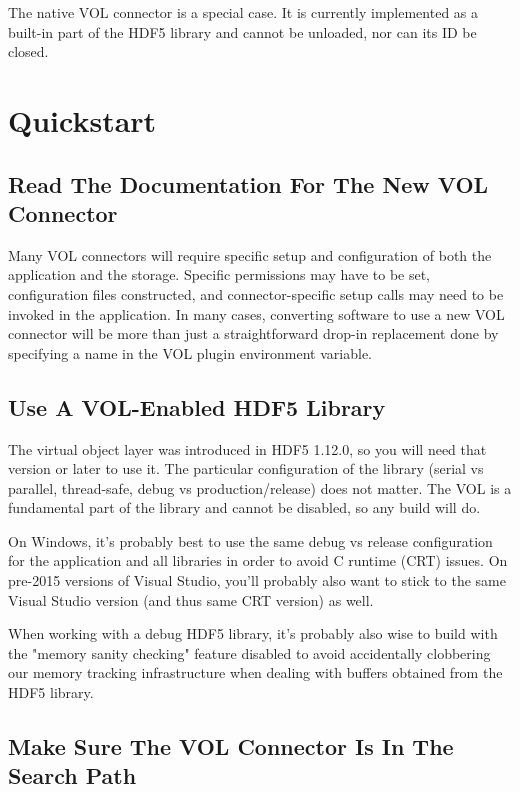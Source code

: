 The native VOL connector is a special case. It is currently implemented as a built-in part of the HDF5 library and cannot be unloaded, nor can its ID be closed.


\section{Quickstart}

\subsection{Read The Documentation For The New VOL Connector}

Many VOL connectors will require specific setup and configuration of both the application and the storage. Specific permissions may have to be set, configuration files constructed, and connector-specific setup calls may need to be invoked in the application. In many cases, converting software to use a new VOL connector will be more than just a straightforward drop-in replacement done by specifying a name in the VOL plugin environment variable.

\subsection{Use A VOL-Enabled HDF5 Library}

The virtual object layer was introduced in HDF5 1.12.0, so you will need that version or later to use it. The particular configuration of the library (serial vs parallel, thread-safe, debug vs production/release) does not matter. The VOL is a fundamental part of the library and cannot be disabled, so any build will do.

On Windows, it's probably best to use the same debug vs release configuration for the application and all libraries in order to avoid C runtime (CRT) issues. On pre-2015 versions of Visual Studio, you'll probably also want to stick to the same Visual Studio version (and thus same CRT version) as well.

When working with a debug HDF5 library, it's probably also wise to build with the "memory sanity checking" feature disabled to avoid accidentally clobbering our memory tracking infrastructure when dealing with buffers obtained from the HDF5 library.

\subsection{Make Sure The VOL Connector Is In The Search Path}

